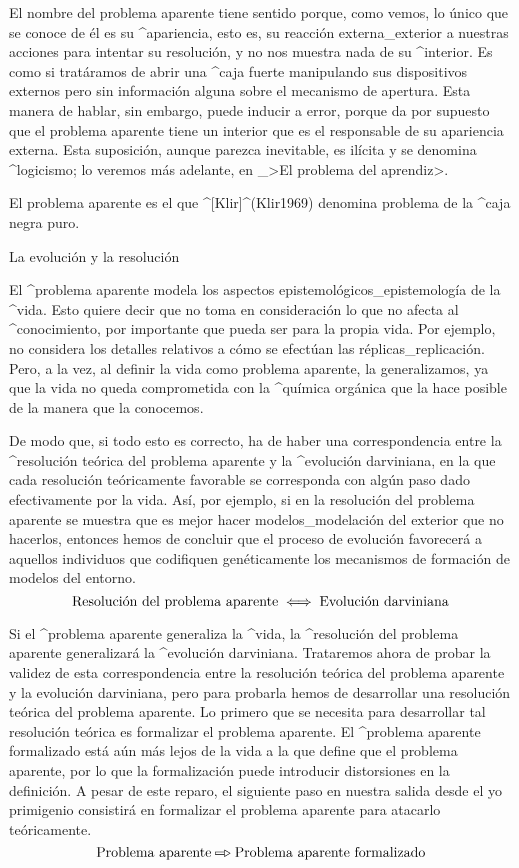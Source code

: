 El nombre del problema aparente tiene sentido porque, como vemos, lo
único que se conoce de él es su ^{apariencia}, esto es, su reacción
externa_{exterior} a nuestras acciones para intentar su resolución, y no
nos muestra nada de su ^{interior}. Es como si tratáramos de abrir una
^{caja fuerte} manipulando sus dispositivos externos pero sin
información alguna sobre el mecanismo de apertura. Esta manera de
hablar, sin embargo, puede inducir a error, porque da por supuesto que
el problema aparente tiene un interior que es el responsable de su
apariencia externa. Esta suposición, aunque parezca inevitable, es
ilícita y se denomina ^{logicismo}; lo veremos más adelante, en
_>El problema del aprendiz>.

El problema aparente es el que ^[Klir]^(Klir1969) denomina problema de
la ^{caja negra} puro.


\Section La evolución y la resolución

El ^{problema aparente} modela los aspectos
epistemológicos_{epistemología} de la ^{vida}. Esto quiere decir que no
toma en consideración lo que no afecta al ^{conocimiento}, por
importante que pueda ser para la propia vida. Por ejemplo, no considera
los detalles relativos a cómo se efectúan las réplicas_{replicación}.
Pero, a la vez, al definir la vida como problema aparente, la
generalizamos, ya que la vida no queda comprometida con la ^{química
orgánica} que la hace posible de la manera que la conocemos.

De modo que, si todo esto es correcto, ha de haber una correspondencia
entre la ^{resolución} teórica del problema aparente y la ^{evolución}
darviniana, en la que cada resolución teóricamente favorable se
corresponda con algún paso dado efectivamente por la vida. Así, por
ejemplo, si en la resolución del problema aparente se muestra que es
mejor hacer modelos_{modelación} del exterior que no hacerlos, entonces
hemos de concluir que el proceso de evolución favorecerá a aquellos
individuos que codifiquen genéticamente los mecanismos de formación de
modelos del entorno.
$$\hbox{Resolución del problema aparente} \iff
  \hbox{Evolución darviniana}$$

Si el ^{problema aparente} generaliza la ^{vida}, la ^{resolución} del
problema aparente generalizará la ^{evolución} darviniana. Trataremos
ahora de probar la validez de esta correspondencia entre la resolución
teórica del problema aparente y la evolución darviniana, pero para
probarla hemos de desarrollar una resolución teórica del problema
aparente. Lo primero que se necesita para desarrollar tal resolución
teórica es formalizar el problema aparente. El ^{problema aparente
formalizado} está aún más lejos de la vida a la que define que el
problema aparente, por lo que la formalización puede introducir
distorsiones en la definición. A pesar de este reparo, el siguiente paso
en nuestra salida desde el yo primigenio consistirá en formalizar el
problema aparente para atacarlo teóricamente.
$$\hbox{Problema aparente} \etapa
 \hbox{Problema aparente formalizado}$$


